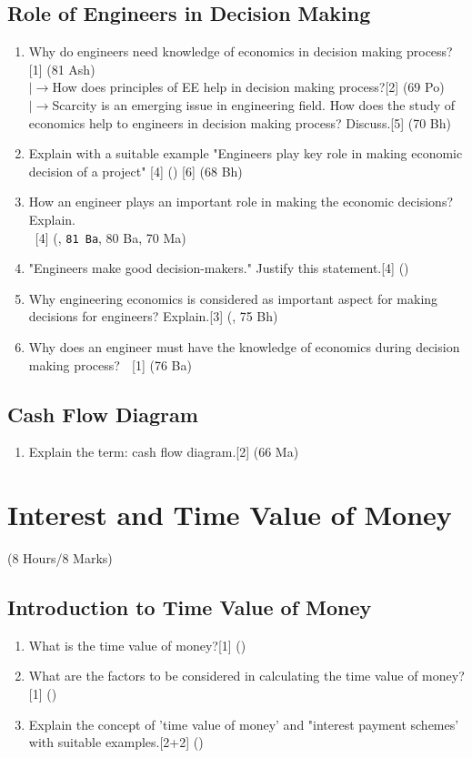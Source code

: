 \documentclass[12pt]{article}
\newcommand{\lb}{\\ $\left|\rightarrow\right.$}
\newcommand{\enter}{\\\textcolor{white}{1}}
\begin{document}
	\subsection{Role of Engineers in Decision Making}
	\begin{enumerate}
	\item Why do engineers need knowledge of economics in decision making process?\hfill[1] (81 Ash)
	\lb How does principles of EE help in decision making process?\hfill[2] (69 Po)
	\lb Scarcity is an emerging issue in engineering field. How does the study of economics help to engineers in decision making process? Discuss.\hfill[5] (70 Bh)

	\item Explain with a suitable example "Engineers play key role in making economic decision of a project" \hfill[4] () [6] (68 Bh)

	\item How an engineer plays an important role in making the economic decisions? Explain.
	\enter\hfill[4] (, \texttt{81 Ba}, 80 Ba, 70 Ma)
	\item "Engineers make good decision-makers." Justify this statement.\hfill[4] ()
	\item Why engineering economics is considered as important aspect for making decisions for engineers? Explain.\hfill[3] (, 75 Bh)
	\item Why does an engineer must have the knowledge of economics during decision making process?
	$\enter$\hfill[1] (76 Ba)
	\end{enumerate}
	\subsection{Cash Flow Diagram}
	\begin{enumerate}
	\item Explain the term: cash flow diagram.\hfill[2] (66 Ma)
	\end{enumerate}

	\pagebreak
\section{Interest and Time Value of Money}
	\begin{center}(8 Hours/8 Marks)\end{center}
	\subsection{Introduction to Time Value of Money}
	\begin{enumerate}
	\item What is the time value of money?\hfill[1] ()

	\item What are the factors to be considered in calculating the time value of money?\hfill[1] ()

	\item Explain the concept of 'time value of money' and "interest payment schemes' with suitable examples.\hspace{14.4cm}[2+2] ()
	\end{enumerate}
\end{document}
